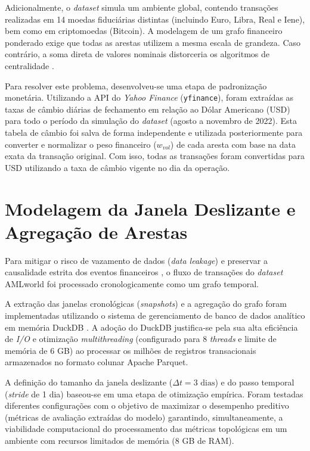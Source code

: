 \documentclass[a4paper,12pt,oneside,onecolumn,final,fleqn]{repUERJ}
\begin{document}
Adicionalmente, o \textit{dataset} simula um ambiente global, contendo transações realizadas em 14 moedas fiduciárias distintas (incluindo Euro, Libra, Real e Iene), bem como em criptomoedas (Bitcoin). A modelagem de um grafo financeiro ponderado exige que todas as arestas utilizem a mesma escala de grandeza. Caso contrário, a soma direta de valores nominais distorceria os algoritmos de centralidade \cite{oliveira2025complex}.

Para resolver este problema, desenvolveu-se uma etapa de padronização monetária. Utilizando a API do \textit{Yahoo Finance} (\texttt{yfinance}), foram extraídas as taxas de câmbio diárias de fechamento em relação ao Dólar Americano (USD) para todo o período da simulação do \textit{dataset} (agosto a novembro de 2022). Esta tabela de câmbio foi salva de forma independente e utilizada posteriormente para converter e normalizar o peso financeiro ($w_{vol}$) de cada aresta com base na data exata da transação original. Com isso, todas as transações foram convertidas para USD utilizando a taxa de câmbio vigente no dia da operação.

\section{Modelagem da Janela Deslizante e Agregação de Arestas}

Para mitigar o risco de vazamento de dados (\textit{data leakage}) e preservar a causalidade estrita dos eventos financeiros \cite{sizan2025machine}, o fluxo de transações do \textit{dataset} AMLworld foi processado cronologicamente como um grafo temporal.

A extração das janelas cronológicas (\textit{snapshots}) e a agregação do grafo foram implementadas utilizando o sistema de gerenciamento de banco de dados analítico em memória DuckDB \cite{raasveldt2019duckdb}. A adoção do DuckDB justifica-se pela sua alta eficiência de \textit{I/O} e otimização \textit{multithreading} (configurado para 8 \textit{threads} e limite de memória de 6 GB) ao processar os milhões de registros transacionais armazenados no formato colunar Apache Parquet.

A definição do tamanho da janela deslizante ($\Delta t = 3\text{ dias}$) e do passo temporal (\textit{stride} de 1 dia) baseou-se em uma etapa de otimização empírica. Foram testadas diferentes configurações com o objetivo de maximizar o desempenho preditivo (métricas de avaliação extraídas do modelo) garantindo, simultaneamente, a viabilidade computacional do processamento das métricas topológicas em um ambiente com recursos limitados de memória (8 GB de RAM). 
\end{document}
